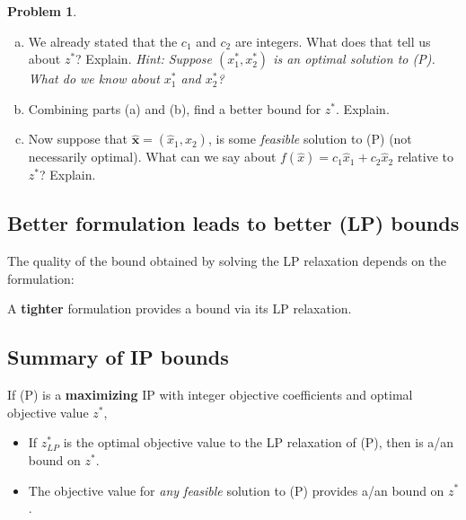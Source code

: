 \documentclass[11pt]{article}
\theoremstyle{definition}
\newtheorem{problem}{Problem}
\newcommand{\answerbox}[3]{%
  \fbox{%
    \begin{minipage}[#1]{#2}
      \hfill\vspace{#3}
    \end{minipage}
  }
}
\newcommand{\wordbox}{\answerbox{c}{1.2in}{.7cm}}
\newcommand{\catbox}{\answerbox{c}{.5in}{.7cm}}
\begin{document}
\begin{problem}
\begin{enumerate}[(a)]
\vspace{1in}

\item We already stated that the $c_1$ and $c_2$ are integers.  What does that tell us about $z^*$?  Explain.  \emph{Hint:  Suppose $(x^*_1, x^*_2)$ is an optimal solution to (P).  What do we know about $x^*_1$ and  $x^*_2$?}

\vspace{1in}


\newpage
\item  Combining parts (a) and (b), find a better bound for $z^*$.  Explain.

\vspace{1in}

\item  Now suppose that $\hat{\mathbf{x}} = (\hat{x}_1, \hat{x}_2)$, is some \emph{feasible} solution to (P) (not necessarily optimal).  What can we say about $f(\hat{x}) =  c_1 \hat{x}_1 + c_2 \hat{x}_2$ relative to $z^*$?  Explain.

\vspace{1in}
\end{enumerate}
\end{problem}

\subsection{Better formulation leads to better (LP) bounds}

The quality of the bound obtained by solving the LP relaxation depends on the formulation:
\begin{center} 
A \textbf{tighter} formulation provides a \wordbox bound via its LP relaxation.
\end{center}

\subsection{Summary of IP bounds}

\begin{tcolorbox}
If (P) is a \textbf{maximizing} IP with integer objective coefficients and optimal objective value $z^*$,
\begin{itemize}
\item  If $z^*_{LP}$ is the optimal objective value to the LP relaxation of (P), then \catbox is a/an \wordbox bound on $z^*$.
\item  The objective value for \emph{any feasible} solution to (P) provides a/an \wordbox bound on $z^*$.
\end{itemize}
\end{tcolorbox}
\end{document}
